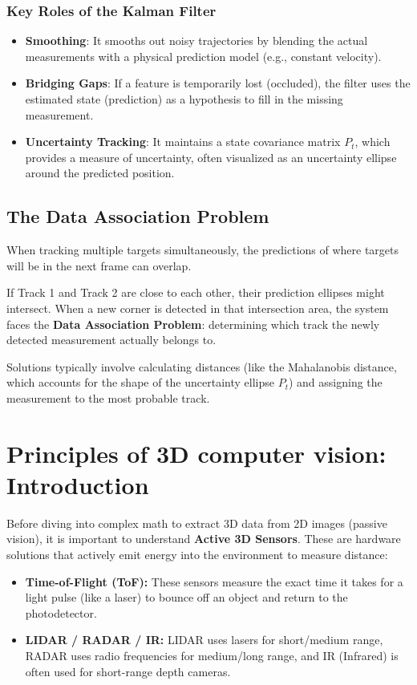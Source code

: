 \documentclass{report}
\begin{document}
\subsection{Key Roles of the Kalman Filter}
\begin{itemize}
    \item \textbf{Smoothing}: It smooths out noisy trajectories by blending the actual measurements with a physical prediction model (e.g., constant velocity).
    \item \textbf{Bridging Gaps}: If a feature is temporarily lost (occluded), the filter uses the estimated state (prediction) as a hypothesis to fill in the missing measurement.
    \item \textbf{Uncertainty Tracking}: It maintains a state covariance matrix $P_t$, which provides a measure of uncertainty, often visualized as an uncertainty ellipse around the predicted position.
\end{itemize}

\section{The Data Association Problem}
When tracking multiple targets simultaneously, the predictions of where targets will be in the next frame can overlap.

If Track 1 and Track 2 are close to each other, their prediction ellipses might intersect. When a new corner is detected
in that intersection area, the system faces the \textbf{Data Association Problem}: determining which track the newly detected
measurement actually belongs to.

Solutions typically involve calculating distances (like the Mahalanobis distance, which accounts for the shape of the uncertainty 
ellipse $P_t$) and assigning the measurement to the most probable track.






\chapter{Principles of 3D computer vision: Introduction}
Before diving into complex math to extract 3D data from 2D images (passive vision), it is important to understand \textbf{Active 3D Sensors}. These are hardware solutions that actively emit energy into the environment to measure distance:
\begin{itemize}
    \item \textbf{Time-of-Flight (ToF):} These sensors measure the exact time it takes for a light pulse (like a laser) to bounce off an object and return to the photodetector.
    \item \textbf{LIDAR / RADAR / IR:} LIDAR uses lasers for short/medium range, RADAR uses radio frequencies for medium/long range, and IR (Infrared) is often used for short-range depth cameras.
\end{itemize}
\end{document}

